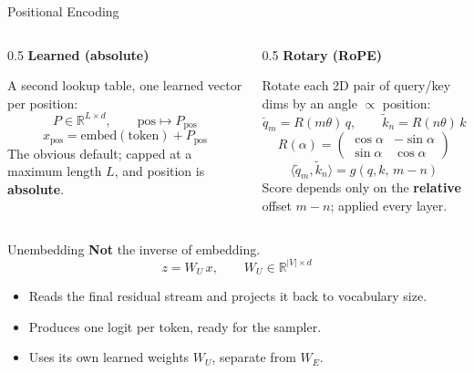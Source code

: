 \documentclass[aspectratio=169]{beamer}
\begin{document}
\begin{frame}{Positional Encoding}
\begin{columns}[T]
\begin{column}{0.5\textwidth}
\centering\textbf{Learned (absolute)}
\smallskip

A second lookup table, one learned vector per position:
\[
P \in \mathbb{R}^{L \times d}, \qquad \text{pos} \mapsto P_{\text{pos}}
\]
\[
x_{\text{pos}} = \text{embed}(\text{token}) + P_{\text{pos}}
\]
The obvious default; capped at a maximum length $L$, and position is \textbf{absolute}.
\end{column}
\begin{column}{0.5\textwidth}
\centering\textbf{Rotary (RoPE)}
\smallskip

Rotate each 2D pair of query/key dims by an angle $\propto$ position:
\[
\tilde{q}_m = R(m\theta)\, q, \qquad \tilde{k}_n = R(n\theta)\, k
\]
\[
R(\alpha) = \begin{pmatrix} \cos\alpha & -\sin\alpha \\ \sin\alpha & \cos\alpha \end{pmatrix}
\]
\[
\langle \tilde{q}_m, \tilde{k}_n \rangle = g(q, k,\, m - n)
\]
Score depends only on the \textbf{relative} offset $m-n$; applied every layer.
\end{column}
\end{columns}
\end{frame}

\begin{frame}{Unembedding}
\textbf{Not} the inverse of embedding.
\[
z = W_U\, x, \qquad W_U \in \mathbb{R}^{|V| \times d}
\]
\begin{itemize}
\item Reads the final residual stream and projects it back to vocabulary size.
\item Produces one logit per token, ready for the sampler.
\item Uses its own learned weights $W_U$, separate from $W_E$.
\end{itemize}
\end{frame}
\end{document}
